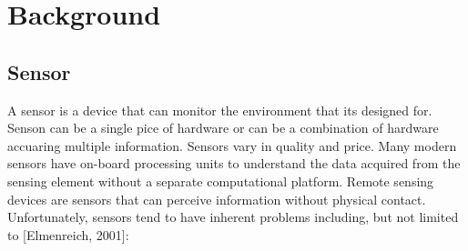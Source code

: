 
\chapter{Background}\label{chapter:background}

\section{Sensor}

A sensor is a device that can  monitor the environment that its designed for. Senson can be a single pice of hardware or can be a combination of hardware  accuaring multiple information.
Sensors vary in quality and price. Many modern sensors have on-board
processing units to understand the data acquired from the sensing element without
a separate computational platform. Remote sensing devices are sensors that can
perceive information without physical contact. Unfortunately, sensors tend to have
inherent problems including, but not limited to [Elmenreich, 2001]:

